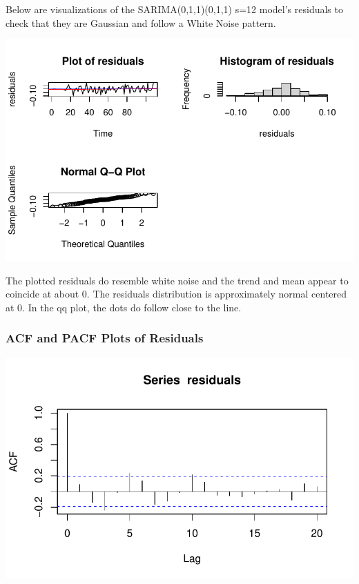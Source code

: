 \documentclass[
  letterpaper,
  DIV=11,
  numbers=noendperiod]{scrartcl}
\begin{document}
Below are visualizations of the SARIMA(0,1,1)(0,1,1) s=12 model's
residuals to check that they are Gaussian and follow a White Noise
pattern.

\includegraphics{Final_Project_files/figure-pdf/unnamed-chunk-30-1.pdf}

The plotted residuals do resemble white noise and the trend and mean
appear to coincide at about 0. The residuals distribution is
approximately normal centered at 0. In the qq plot, the dots do follow
close to the line.

\hypertarget{acf-and-pacf-plots-of-residuals}{%
\subsubsection{ACF and PACF Plots of
Residuals}\label{acf-and-pacf-plots-of-residuals}}

\includegraphics{Final_Project_files/figure-pdf/unnamed-chunk-31-1.pdf}
\end{document}
